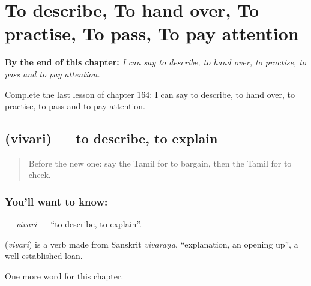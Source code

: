 
\chapter{To describe, To hand over, To practise, To pass, To pay attention}
\label{ch:ta-to-describe-to-hand-over-to-practise-to-pass-to-pay-attention}

\begin{chapteropening}
\textbf{By the end of this chapter:} \emph{I can say to describe, to hand over, to practise, to pass and to pay attention.}

Complete the last lesson of chapter 164: I can say to describe, to hand over, to practise, to pass and to pay attention.
\end{chapteropening}

\section[\texorpdfstring{\ta{விவரி} (vivari)}{விவரி (vivari)}]{ (vivari) — to describe, to explain}

\label{lesson:TA-C164-vivari}



\begin{quote}
Before the new one: say the Tamil for to bargain, then the Tamil for to check.
\end{quote}

\subsection*{You'll want to know: }
\textbf{} — \emph{vivari} — \textquotedblleft{}to describe, to explain\textquotedblright{}.

\begin{cousinweb}
\textbf{} (\emph{vivari}) is a verb made from Sanskrit \emph{vivaraṇa}, \textquotedblleft{}explanation, an opening up\textquotedblright{}, a well-established loan.
\end{cousinweb}

\begin{grammarlens}[title={What you've built}]
One more word for this chapter.
\end{grammarlens}

